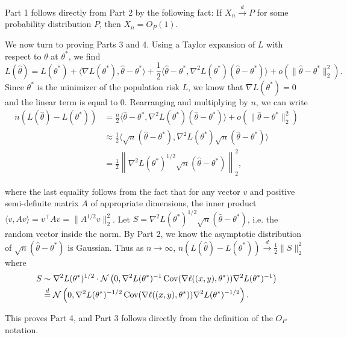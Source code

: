 Part 1 follows directly from Part 2 by the following fact: If $X_n \stackrel{d}{\rightarrow} P$ for some probability distribution $P$, then $X_n = O_P(1)$.

We now turn to proving Parts 3 and 4. Using a Taylor expansion of $L$ with respect to $\theta$ at $\theta^*$, we find
\begin{equation}
L(\hat \theta) = L(\theta^*) 
+ \langle \nabla L(\theta^*), \hat \theta - \theta^* \rangle 
+ \frac12 \langle \hat \theta - \theta^*, \nabla^2 L(\theta^*) (\hat \theta - \theta^*) \rangle + o(\|\hat \theta - \theta^*\|_2^2).
\end{equation}
Since $\theta^*$ is the minimizer of the population risk $L$, we know that $\nabla L(\theta^*) = 0$ and the linear term is equal to 0. Rearranging and multiplying by $n$, we can write
\begin{align}
n (L(\hat \theta) - L(\theta^*)) &= \frac{n}{2} \langle \hat \theta - \theta^*, \nabla^2 L(\theta^*) (\hat \theta - \theta^*) \rangle + o(\|\hat \theta - \theta^*\|_2^2) \\
&\approx \frac12 \langle \sqrt n(\hat \theta - \theta^*), \nabla^2 L(\theta^*) \sqrt n (\hat \theta - \theta^*) \rangle \\
&= \frac12 \left\|\nabla^2 L(\theta^*)^{1/2} \sqrt n(\hat \theta - \theta^*) \right\|_2^2,
\end{align}

where the last equality follows from the fact that for any vector $v$ and positive semi-definite matrix $A$ of appropriate dimensions, the inner product $\langle v, Av\rangle = v^\top Av = \lVert A^{1/2}v \rVert_2^2$. Let $S = \nabla^2 L(\theta^*)^{1/2} \sqrt n(\hat \theta - \theta^*)$, i.e. the random vector inside the norm. By Part 2, we know the asymptotic distribution of $\sqrt n(\hat \theta - \theta^*)$ is Gaussian. Thus as $n \to \infty$, $n (L(\hat \theta) - L(\theta^*)) \overset d \to \frac12 \|S\|_2^2$ where
\begin{align}
    S &\sim \nabla^2 L(\theta^*)^{1/2} \cdot \mathcal N \left(0, \nabla^2 L(\theta^*)^{-1} \operatorname{Cov}(\nabla \ell ((x, y), \theta^*)) \nabla^2 L(\theta^*)^{-1} \right) \\
    &\stackrel{d}{=} \mathcal N \left(0, \nabla^2 L(\theta^*)^{-1/2} \operatorname{Cov}(\nabla \ell ((x, y), \theta^*)) \nabla^2 L(\theta^*)^{-1/2} \right).
\end{align}

This proves Part 4, and Part 3 follows directly from the definition of the $O_P$ notation.

